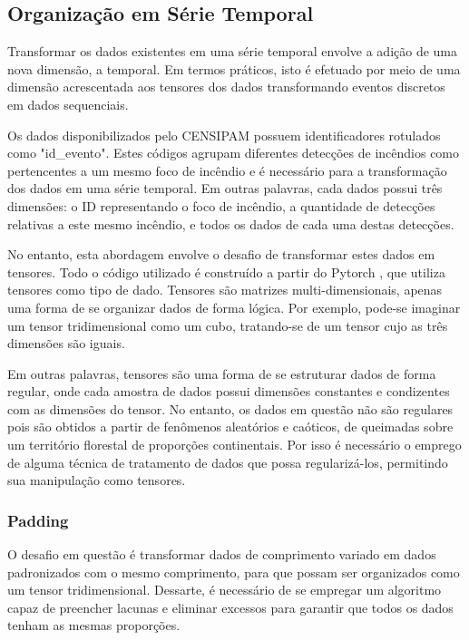 \subsection{Organização em Série Temporal}

Transformar os dados existentes em uma série temporal envolve a adição de uma nova dimensão, a temporal. Em termos práticos, isto é efetuado por meio de uma dimensão acrescentada aos tensores dos dados transformando eventos discretos em dados sequenciais. 

Os dados disponibilizados pelo CENSIPAM possuem identificadores rotulados como "id\_evento". Estes códigos agrupam diferentes detecções de incêndios como pertencentes a um mesmo foco de incêndio e é necessário para a transformação dos dados em uma série temporal. Em outras palavras, cada dados possui três dimensões: o ID representando o foco de incêndio, a quantidade de detecções relativas a este mesmo incêndio, e todos os dados de cada uma destas detecções.

No entanto, esta abordagem envolve o desafio de transformar estes dados em tensores. Todo o código utilizado é construído a partir do Pytorch \cite{NEURIPS2019_9015}, que utiliza tensores como tipo de dado. Tensores são matrizes multi-dimensionais, apenas uma forma de se organizar dados de forma lógica. Por exemplo, pode-se imaginar um tensor tridimensional como um cubo, tratando-se de um tensor cujo as três dimensões são iguais.

Em outras palavras, tensores são uma forma de se estruturar dados de forma regular, onde cada amostra de dados possui dimensões constantes e condizentes com as dimensões do tensor. No entanto, os dados em questão não são regulares pois são obtidos a partir de fenômenos aleatórios e caóticos, de queimadas sobre um território florestal de proporções continentais. Por isso é necessário o emprego de alguma técnica de tratamento de dados que possa regularizá-los, permitindo sua manipulação como tensores.

\subsubsection{Padding}

O desafio em questão é transformar dados de comprimento variado em dados padronizados com o mesmo comprimento, para que possam ser organizados como um tensor tridimensional. Dessarte, é necessário de se empregar um algoritmo capaz de preencher lacunas e eliminar excessos para garantir que todos os dados tenham as mesmas proporções.

